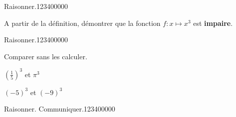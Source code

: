 
\begin{pageAD}  %
\restoregeometry %
 

\begin{ExoCad}{Raisonner.}{1234}{0}{0}{0}{0}{0}

A partir de la définition, démontrer que la fonction $f:x\mapsto x^3$ est \textbf{impaire}.


%
%
%

\end{ExoCad} 

\begin{ExoCad}{Raisonner.}{1234}{0}{0}{0}{0}{0}

Comparer sans les calculer.

\begin{description}[leftmargin=*]
\item $\left(\frac{1}{5}\right)^3$ et $\pi^3$  

%


\item $(-5)^3$ et $(-9)^3$

%

\end{description}

\end{ExoCad} 


\begin{ExoCad}{Raisonner. Communiquer.}{1234}{0}{0}{0}{0}{0}


\end{ExoCad}
\end{pageAD}
